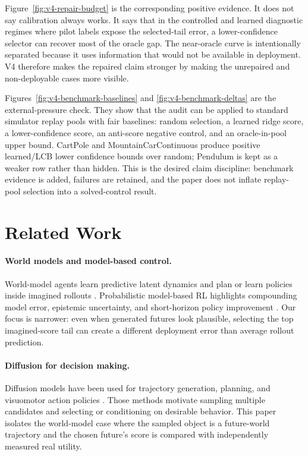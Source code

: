\documentclass{article}
\begin{document}
Figure~\ref{fig:v4-repair-budget} is the corresponding positive evidence. It
does not say calibration always works. It says that in the controlled and
learned diagnostic regimes where pilot labels expose the selected-tail error,
a lower-confidence selector can recover most of the oracle gap. The
near-oracle curve is intentionally separated because it uses information that
would not be available in deployment. V4 therefore makes the repaired claim
stronger by making the unrepaired and non-deployable cases more visible.

Figures~\ref{fig:v4-benchmark-baselines} and
\ref{fig:v4-benchmark-deltas} are the external-pressure check. They show that
the audit can be applied to standard simulator replay pools with fair baselines:
random selection, a learned ridge score, a lower-confidence score, an anti-score
negative control, and an oracle-in-pool upper bound. CartPole and
MountainCarContinuous produce positive learned/LCB lower confidence bounds over
random; Pendulum is kept as a weaker row rather than hidden. This is the desired
claim discipline: benchmark evidence is added, failures are retained, and the
paper does not inflate replay-pool selection into a solved-control result.

\section{Related Work}

\paragraph{World models and model-based control.}
World-model agents learn predictive latent dynamics and plan or learn policies inside imagined rollouts \citep{ha2018worldmodels,hafner2019planet,hafner2020dreamer,hafner2023dreamerv3}. Probabilistic model-based RL highlights compounding model error, epistemic uncertainty, and short-horizon policy improvement \citep{chua2018pets,janner2019mbpo}. Our focus is narrower: even when generated futures look plausible, selecting the top imagined-score tail can create a different deployment error than average rollout prediction.

\paragraph{Diffusion for decision making.}
Diffusion models have been used for trajectory generation, planning, and visuomotor action policies \citep{janner2022diffuser,ajay2023decisiondiffuser,chi2023diffusionpolicy}. Those methods motivate sampling multiple candidates and selecting or conditioning on desirable behavior. This paper isolates the world-model case where the sampled object is a future-world trajectory and the chosen future's score is compared with independently measured real utility.
\end{document}
